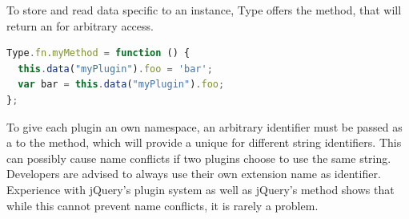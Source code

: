 \noindent To store and read data specific to an instance, Type offers the  method, that will return an  for arbitrary access.

\begin{lstlisting}[language=JavaScript, caption=Example calls to format text, label=lst:format-examples]
Type.fn.myMethod = function () {
  this.data("myPlugin").foo = 'bar';
  var bar = this.data("myPlugin").foo;
};
\end{lstlisting}

\noindent To give each plugin an own namespace, an arbitrary identifier must be passed as a  to the  method, which will provide a unique  for different string identifiers. This can possibly cause name conflicts if two plugins choose to use the same string. Developers are advised to always use their own extension name as identifier. Experience with jQuery's plugin system as well as jQuery's  method shows that while this cannot prevent name conflicts, it is rarely a problem.


